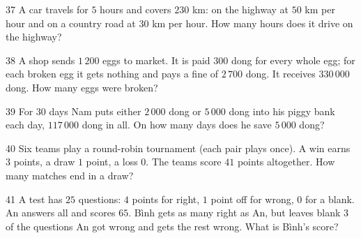 \gap
\begin{probbox}{37}{}
A car travels for $5$ hours and covers $230$ km: on the highway at $50$ km per hour and on a country road at $30$ km per hour. How many hours does it drive on the highway?
\end{probbox}
\gap
\begin{probbox}{38}{}
A shop sends $1\,200$ eggs to market. It is paid $300$ dong for every whole egg; for each broken egg it gets nothing and pays a fine of $2\,700$ dong. It receives $330\,000$ dong. How many eggs were broken?
\end{probbox}
\gap
\begin{probbox}{39}{}
For $30$ days Nam puts either $2\,000$ dong or $5\,000$ dong into his piggy bank each day, $117\,000$ dong in all. On how many days does he save $5\,000$ dong?
\end{probbox}
\gap
\begin{probbox}{40}{}
Six teams play a round-robin tournament (each pair plays once). A win earns $3$ points, a draw $1$ point, a loss $0$. The teams score $41$ points altogether. How many matches end in a draw?
\end{probbox}
\gap
\begin{probbox}{41}{}
A test has $25$ questions: $4$ points for right, $1$ point off for wrong, $0$ for a blank. An answers all and scores $65$. Bình gets as many right as An, but leaves blank $3$ of the questions An got wrong and gets the rest wrong. What is Bình's score?
\end{probbox}
